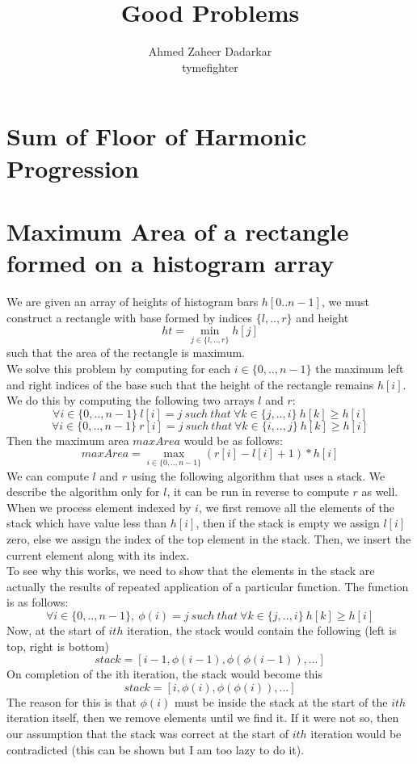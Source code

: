 \documentclass{article}
\title{Good Problems}
\author{
    Ahmed Zaheer Dadarkar\\
    tymefighter
}
\begin{document}
    \maketitle

    \section{Sum of Floor of Harmonic Progression}

    \section{Maximum Area of a rectangle formed on a histogram array}

    We are given an array of heights of histogram bars $h[0..n-1]$, we
    must construct a rectangle with base formed by indices $\{l,..,r\}$
    and height
    \[
        ht = \min_{j \in \{l,..,r\}}{h[j]}
    \]
    such that the area of the rectangle is maximum. \\
    We solve this problem by computing for each $i \in \{0,..,n-1\}$ 
    the maximum left and right indices of the base such that the height
    of the rectangle remains $h[i]$. We do this by computing the following
    two arrays $l$ and $r$:
    \[
        \forall i \in \{0,..,n-1\} ~
            l[i] = j ~ such ~ that ~ \forall k \in \{j,..,i\} ~
                h[k] \geq h[i]
    \]
    \[
        \forall i \in \{0,..,n-1\} ~
            r[i] = j ~ such ~ that ~ \forall k \in \{i,..,j\} ~
                h[k] \geq h[i]
    \]
    Then the maximum area $maxArea$ would be as follows:
    \[
        maxArea = \max_{i \in \{0,..,n-1\}}{(r[i] - l[i] + 1) * h[i]}
    \]
    We can compute $l$ and $r$ using the following algorithm that uses a stack.
    We describe the algorithm only for $l$, it can be run in reverse to compute
    $r$ as well. When we process element indexed by $i$, we first remove all
    the elements of the stack which have value less than $h[i]$, then if the
    stack is empty we assign $l[i]$ zero, else we assign the index of the top
    element in the stack. Then, we insert the current element along with its
    index. \\
    To see why this works, we need to show that the elements in the stack are
    actually the results of repeated application of a particular function.
    The function is as follows:
    \[
		\forall i \in \{0,..,n-1\}, ~ \phi(i) =
            j ~ such ~ that ~ \forall k \in \{j,..,i\} ~
            h[k] \geq h[i]
    \]
    Now, at the start of $ith$ iteration, the stack would contain the following
    (left is top, right is bottom)
    \[
        stack = [i - 1, \phi(i - 1), \phi(\phi(i - 1)), ...]
    \]
    On completion of the ith iteration, the stack would become this
    \[
        stack = [i, \phi(i), \phi(\phi(i)), ...]
    \]
    The reason for this is that $\phi(i)$ must be inside the stack at the
    start of the $ith$ iteration itself, then we remove elements until we find
    it. If it were not so, then our assumption that the stack was correct at
    the start of $ith$ iteration would be contradicted (this can be shown but I am
    too lazy to do it).
\end{document}
